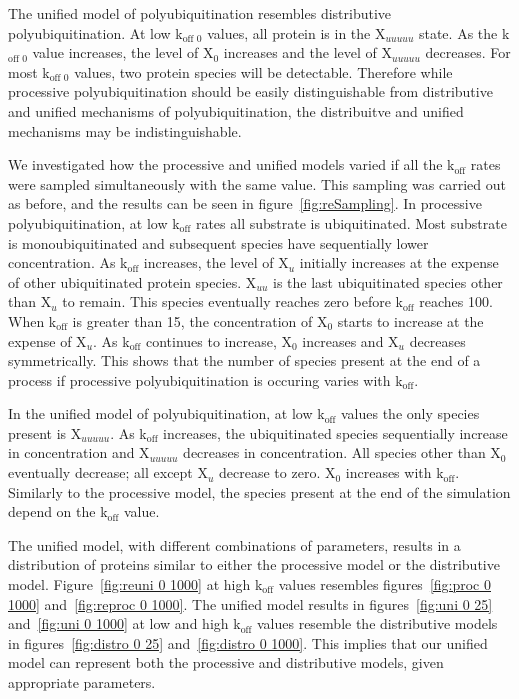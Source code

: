 \documentclass[11pt]{article}
\begin{document}
The unified model of polyubiquitination resembles distributive polyubiquitination. At low k$_\text{off 0}$ values, all protein is in the X$_{uuuuu}$ state. As the k$_\text{off 0}$ value increases, the level of X$_0$ increases and the level of X$_{uuuuu}$ decreases. For most k$_\text{off 0}$ values, two protein species will be detectable. Therefore while processive polyubiquitination should be easily distinguishable from distributive and unified mechanisms of polyubiquitination, the distribuitve and unified mechanisms may be indistinguishable.

We investigated how the processive and unified models varied if all the k$_\text{off}$ rates were sampled simultaneously with the same value. This sampling was carried out as before, and the results can be seen in figure~\ref{fig:reSampling}. In processive polyubiquitination, at low k$_\text{off}$ rates all substrate is ubiquitinated. Most substrate is monoubiquitinated and subsequent species have sequentially lower concentration. As k$_\text{off}$ increases, the level of X$_u$ initially increases at the expense of other ubiquitinated protein species. X$_{uu}$ is the last ubiquitinated species other than X$_u$ to remain. This species eventually reaches zero before k$_\text{off}$ reaches 100. When k$_\text{off}$ is greater than 15, the concentration of X$_0$ starts to increase at the expense of X$_u$. As k$_\text{off}$ continues to increase, X$_0$ increases and X$_u$ decreases symmetrically. This shows that the number of species present at the end of a process if processive polyubiquitination is occuring varies with k$_\text{off}$.

In the unified model of polyubiquitination, at low k$_\text{off}$ values the only species present is X$_{uuuuu}$. As k$_\text{off}$ increases, the ubiquitinated species sequentially increase in concentration and X$_{uuuuu}$ decreases in concentration. All species other than X$_0$ eventually decrease; all except X$_u$ decrease to zero. X$_0$ increases with k$_\text{off}$. Similarly to the processive model, the species present at the end of the simulation depend on the k$_\text{off}$ value.

The unified model, with different combinations of parameters, results in a distribution of proteins similar to either the processive model or the distributive model. Figure~\ref{fig:reuni 0 1000} at high k$_\text{off}$ values resembles figures~\ref{fig:proc 0 1000} and~\ref{fig:reproc 0 1000}. The unified model results in figures~\ref{fig:uni 0 25} and~\ref{fig:uni 0 1000} at low and high k$_\text{off}$ values resemble the distributive models in figures~\ref{fig:distro 0 25} and~\ref{fig:distro 0 1000}. This implies that our unified model can represent both the processive and distributive models, given appropriate parameters.
\end{document}
